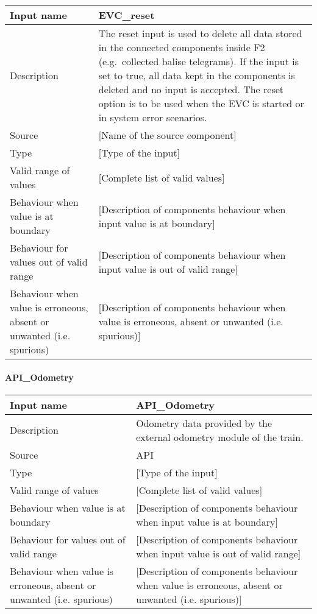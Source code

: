 \begin{longtable}{p{}p{}}
\toprule
Input name				& EVC\_reset \\
\midrule
Description				&  The reset input is used to delete all data stored in the connected components inside F2 (e.g.~collected balise telegrams). If the input is set to true, all data kept in the components is deleted and no input is accepted. The reset option is to be used when the EVC is started or in system error scenarios. \\
\midrule
Source					& [Name of the source component] \\ 
\midrule
Type					& [Type of the input] \\
\midrule
Valid range of values	& [Complete list of valid values] \\
\midrule
Behaviour when value is at boundary	& [Description of components behaviour when input value is at boundary] \\
\midrule
Behaviour for values out of valid range	& [Description of components behaviour when input value is out of valid range] \\
\midrule
Behaviour when value is erroneous, absent or unwanted (i.e. spurious) & [Description of components behaviour when value is erroneous, absent or unwanted (i.e. spurious)] \\
\bottomrule
\end{longtable}

\paragraph{API\_Odometry}

\begin{longtable}{p{}p{}}
\toprule
Input name				& API\_Odometry \\
\midrule
Description				& Odometry data provided by the external odometry module of the train. \\
\midrule
Source					& API \\ 
\midrule
Type					& [Type of the input] \\
\midrule
Valid range of values	& [Complete list of valid values] \\
\midrule
Behaviour when value is at boundary	& [Description of components behaviour when input value is at boundary] \\
\midrule
Behaviour for values out of valid range	& [Description of components behaviour when input value is out of valid range] \\
\midrule
Behaviour when value is erroneous, absent or unwanted (i.e. spurious) & [Description of components behaviour when value is erroneous, absent or unwanted (i.e. spurious)] \\
\bottomrule
\end{longtable}

